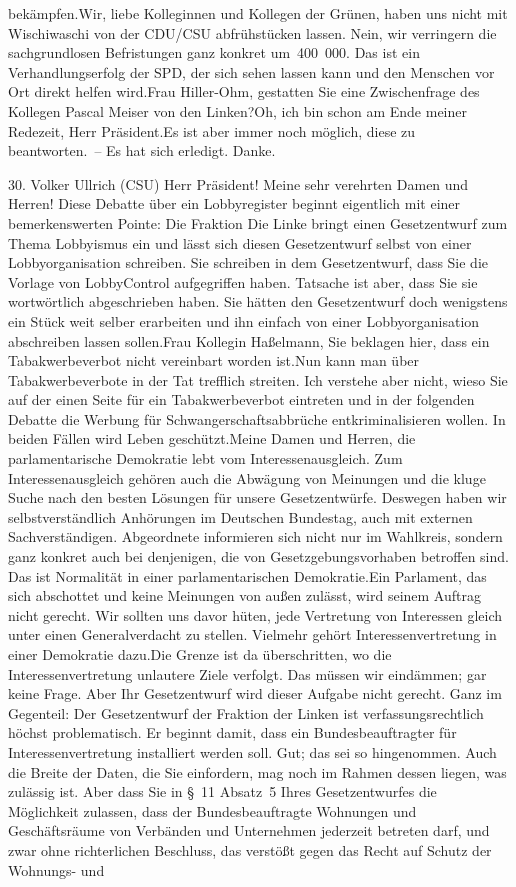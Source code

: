 \documentclass{article}
\begin{document}
bekämpfen.Wir, liebe Kolleginnen und Kollegen der Grünen, haben uns nicht mit Wischiwaschi von der CDU/CSU abfrühstücken lassen. Nein, wir verringern die sachgrundlosen Befristungen ganz konkret um 400 000. Das ist ein Verhandlungserfolg der SPD, der sich sehen lassen kann und den Menschen vor Ort direkt helfen wird.Frau Hiller-Ohm, gestatten Sie eine Zwischenfrage des Kollegen Pascal Meiser von den Linken?Oh, ich bin schon am Ende meiner Redezeit, Herr Präsident.Es ist aber immer noch möglich, diese zu beantworten. – Es hat sich erledigt. Danke.




	30. Volker Ullrich (CSU) Herr Präsident! Meine sehr verehrten Damen und Herren! Diese Debatte über ein Lobbyregister beginnt eigentlich mit einer bemerkenswerten Pointe: Die Fraktion Die Linke bringt einen Gesetzentwurf zum Thema Lobbyismus ein und lässt sich diesen Gesetzentwurf selbst von einer Lobbyorganisation schreiben. Sie schreiben in dem Gesetzentwurf, dass Sie die Vorlage von LobbyControl aufgegriffen haben. Tatsache ist aber, dass Sie sie wortwörtlich abgeschrieben haben. Sie hätten den Gesetzentwurf doch wenigstens ein Stück weit selber erarbeiten und ihn einfach von einer Lobbyorganisation abschreiben lassen sollen.Frau Kollegin Haßelmann, Sie beklagen hier, dass ein Tabakwerbeverbot nicht vereinbart worden ist.Nun kann man über Tabakwerbeverbote in der Tat trefflich streiten. Ich verstehe aber nicht, wieso Sie auf der einen Seite für ein Tabakwerbeverbot eintreten und in der folgenden Debatte die Werbung für Schwangerschaftsabbrüche entkriminalisieren wollen. In beiden Fällen wird Leben geschützt.Meine Damen und Herren, die parlamentarische Demokratie lebt vom Interessenausgleich. Zum Interessenausgleich gehören auch die Abwägung von Meinungen und die kluge Suche nach den besten Lösungen für unsere Gesetzentwürfe. Deswegen haben wir selbstverständlich Anhörungen im Deutschen Bundestag, auch mit externen Sachverständigen. Abgeordnete informieren sich nicht nur im Wahlkreis, sondern ganz konkret auch bei denjenigen, die von Gesetzgebungsvorhaben betroffen sind. Das ist Normalität in einer parlamentarischen Demokratie.Ein Parlament, das sich abschottet und keine Meinungen von außen zulässt, wird seinem Auftrag nicht gerecht. Wir sollten uns davor hüten, jede Vertretung von Interessen gleich unter einen Generalverdacht zu stellen. Vielmehr gehört Interessenvertretung in einer Demokratie dazu.Die Grenze ist da überschritten, wo die Interessenvertretung unlautere Ziele verfolgt. Das müssen wir eindämmen; gar keine Frage. Aber Ihr Gesetzentwurf wird dieser Aufgabe nicht gerecht. Ganz im Gegenteil: Der Gesetzentwurf der Fraktion der Linken ist verfassungsrechtlich höchst problematisch. Er beginnt damit, dass ein Bundesbeauftragter für Interessenvertretung installiert werden soll. Gut; das sei so hingenommen. Auch die Breite der Daten, die Sie einfordern, mag noch im Rahmen dessen liegen, was zulässig ist. Aber dass Sie in § 11 Absatz 5 Ihres Gesetzentwurfes die Möglichkeit zulassen, dass der Bundesbeauftragte Wohnungen und Geschäftsräume von Verbänden und Unternehmen jederzeit betreten darf, und zwar ohne richterlichen Beschluss, das verstößt gegen das Recht auf Schutz der Wohnungs- und 
\end{document}
